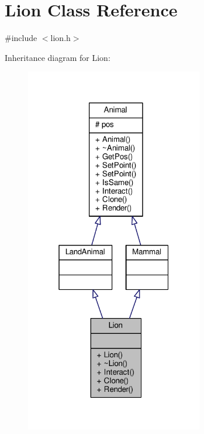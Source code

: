 \hypertarget{classLion}{}\section{Lion Class Reference}
\label{classLion}


{\ttfamily \#include $<$lion.\+h$>$}



Inheritance diagram for Lion\+:
\nopagebreak
\begin{figure}[H]
\begin{center}
\leavevmode
\includegraphics[width=220pt]{classLion__inherit__graph}
\end{center}
\end{figure}


